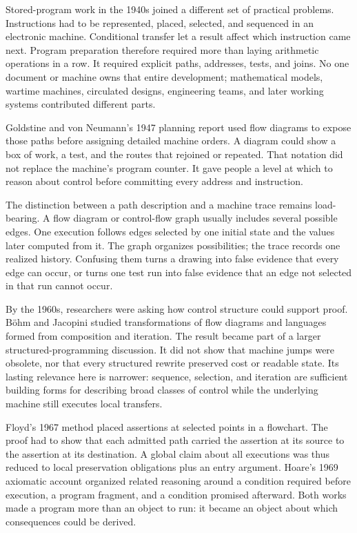 Stored-program work in the 1940s joined a different set of practical problems.
Instructions had to be represented, placed, selected, and sequenced in an
electronic machine. Conditional transfer let a result affect which instruction
came next. Program preparation therefore required more than laying arithmetic
operations in a row. It required explicit paths, addresses, tests, and joins.
No one document or machine owns that entire development; mathematical models,
wartime machines, circulated designs, engineering teams, and later working
systems contributed different parts.

Goldstine and von Neumann's 1947 planning report used flow diagrams to expose
those paths before assigning detailed machine orders. A diagram could show a
box of work, a test, and the routes that rejoined or repeated. That notation
did not replace the machine's program counter. It gave people a level at which
to reason about control before committing every address and instruction.
\autocite{goldstine1947planning}

The distinction between a path description and a machine trace remains
load-bearing. A flow diagram or control-flow graph usually includes several
possible edges. One execution follows edges selected by one initial state and
the values later computed from it. The graph organizes possibilities; the
trace records one realized history. Confusing them turns a drawing into false
evidence that every edge can occur, or turns one test run into false evidence
that an edge not selected in that run cannot occur.

By the 1960s, researchers were asking how control structure could support
proof. B{\"o}hm and Jacopini studied transformations of flow diagrams and
languages formed from composition and iteration. The result became part of a
larger structured-programming discussion. It did not show that machine jumps
were obsolete, nor that every structured rewrite preserved cost or readable
state. Its lasting relevance here is narrower: sequence, selection, and
iteration are sufficient building forms for describing broad classes of
control while the underlying machine still executes local transfers.
\autocite{bohm1966flow}

Floyd's 1967 method placed assertions at selected points in a flowchart. The
proof had to show that each admitted path carried the assertion at its source
to the assertion at its destination. A global claim about all executions was
thus reduced to local preservation obligations plus an entry argument. Hoare's
1969 axiomatic account organized related reasoning around a condition required
before execution, a program fragment, and a condition promised afterward.
Both works made a program more than an
object to run: it became an object about which consequences could be derived.
\autocite{floyd1967meanings,hoare1969axiomatic}

